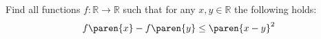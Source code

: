 Find all functions $f: \mathbb{R} \to \mathbb{R}$
such that for any $x, y \in \mathbb{R}$ the following holds:
\begin{equation*}
  f\paren{x} - f\paren{y} \leq \paren{x - y}^2
\end{equation*}
